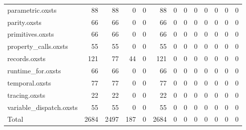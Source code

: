 \begin{tabular}{lrrrrrrrrrrrr}
parametric.oxsts & 88 & 88 & 0 & 0 & 88 & 0 & 0 & 0 & 0 & 0 & 0 & 0 \\
parity.oxsts & 66 & 66 & 0 & 0 & 66 & 0 & 0 & 0 & 0 & 0 & 0 & 0 \\
primitives.oxsts & 66 & 66 & 0 & 0 & 66 & 0 & 0 & 0 & 0 & 0 & 0 & 0 \\
property\_calls.oxsts & 55 & 55 & 0 & 0 & 55 & 0 & 0 & 0 & 0 & 0 & 0 & 0 \\
records.oxsts & 121 & 77 & 44 & 0 & 121 & 0 & 0 & 0 & 0 & 0 & 0 & 0 \\
runtime\_for.oxsts & 66 & 66 & 0 & 0 & 66 & 0 & 0 & 0 & 0 & 0 & 0 & 0 \\
temporal.oxsts & 77 & 77 & 0 & 0 & 77 & 0 & 0 & 0 & 0 & 0 & 0 & 0 \\
tracing.oxsts & 22 & 22 & 0 & 0 & 22 & 0 & 0 & 0 & 0 & 0 & 0 & 0 \\
variable\_dispatch.oxsts & 55 & 55 & 0 & 0 & 55 & 0 & 0 & 0 & 0 & 0 & 0 & 0 \\
\midrule
Total & 2684 & 2497 & 187 & 0 & 2684 & 0 & 0 & 0 & 0 & 0 & 0 & 0 \\
\bottomrule
\end{tabular}
